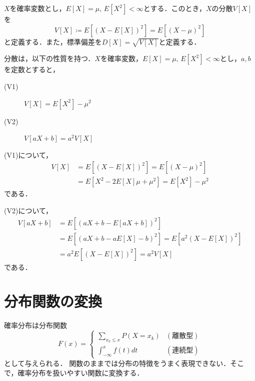 \documentclass{jsreport}
\begin{document}
\begin{screen}
  \begin{defi}[分散]
    $X$を確率変数とし，$E[X] = \mu, \, E[X^2] < \infty$とする．このとき，$X$の分散$V[X]$を
    \begin{equation}
      V[X] \coloneqq E[(X - E[X])^2] = E[(X - \mu)^2] \nonumber
    \end{equation}
    と定義する．また，標準偏差を$D[X] = \sqrt{V[X]}$と定義する．
  \end{defi}
\end{screen}

分散は，以下の性質を持つ．$X$を確率変数，$E[X] = \mu, \, E[X^2] < \infty$とし，$a, b$を定数とすると，
\begin{description}
  \item[(V1)] $V[X] = E[X^2] - \mu^2$
  \item[(V2)] $V[aX + b] = a^2V[X]$
\end{description}

(V1)について，
\begin{align}
  V[X] &= E[(X-E[X])^2] = E[(X - \mu)^2] \nonumber \\
  &= E[X^2 - 2E[X]\mu + \mu^2] = E[X^2] - \mu^2 \nonumber
\end{align}
である．

(V2)について，
\begin{align}
  V[aX + b] &= E[(aX + b - E[aX + b])^2] \nonumber \\
  &= E[(aX + b - aE[X] -b)^2] = E[a^2(X - E[X])^2] \nonumber \\
  &= a^2 E[(X - E[X])^2] = a^2 V[X] \nonumber
\end{align}
である．

\section{分布関数の変換}
確率分布は分布関数
\begin{equation}
  F(x) = \begin{cases}
    \sum_{x_k \leq x} P(X = x_k) & (離散型) \\
    \int_{-\infty}^x f(t)dt & (連続型)
\end{cases}\nonumber
\end{equation}
として与えられる．
関数のままでは分布の特徴をうまく表現できない．そこで，確率分布を扱いやすい関数に変換する．
\end{document}
